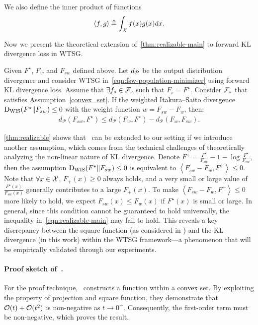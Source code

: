 We also define the inner product of functions 
$$\left \langle f,g \right \rangle \triangleq \int_{\mathcal{X}} f(x)g(x) d x.$$


Now we present the theoretical extension of~\cref{thm:realizable-main} to forward KL divergence loss in WTSG.





\begin{corollary} \label{thm:realizable}
Given $F^\star$, $F_w$ and $F_{sw}$ defined above.
Let $d_\mathcal{P}$ be the output distribution divergence and consider WTSG in~\cref{eqn:fsw-population-minimizer} using forward KL divergence loss.
Assume that $\exists f_s \in \mathcal{F}_s$ such that $F_s = F^\star$.
Consider $\mathcal{F}_s$ that satisfies Assumption~\ref{convex_set}. 
If the weighted Itakura–Saito divergence $\mathrm{D}_{\mathrm{WIS}}(F^\star \| F_{sw}) \le 0$ with the weight function $w=F_{sw} - F_w$, then:
\begin{align} \label{eqn:realizable}
    d_{\mathcal{P}}\left(F_{sw}, F^\star\right) \leq d_{\mathcal{P}}\left(F_w, F^\star\right)-d_{\mathcal{P}}\left(F_w, F_{sw}\right).
\end{align}
\end{corollary}

\cref{thm:realizable} shows that~\citet{charikar2024quantifying} can be extended to our setting if we introduce another assumption, which comes from the technical challenges of theoretically analyzing the non-linear nature of KL divergence.
Denote $F^+ = \frac{F^\star}{F_{sw}} - 1 - \log{\frac{F^\star}{F_{sw}}}$, then the assumption $\mathrm{D}_{\mathrm{WIS}}(F^\star \| F_{sw}) \le 0$ is equivalent to $\left \langle F_{sw} - F_w, F^+ \right \rangle \le 0$.
Note that $\forall x \in \mathcal{X}$, $F_+(x) \ge 0$ always holds, and a very small or large value of $\frac{F^\star(x)}{F_{sw}(x)}$ generally contributes to a large $F_+(x)$.
To make $\left \langle F_{sw} - F_w, F^+ \right \rangle \le 0$ more likely to hold, we expect $F_{sw}(x) \le F_w(x)$ if $F^\star(x)$ is small or large.
In general, since this condition cannot be guaranteed to hold universally, the inequality in~\cref{eqn:realizable-main} may fail to hold. 
This reveals a key discrepancy between the square function (as considered in \citet{charikar2024quantifying}) and the KL divergence (in this work) within the WTSG framework—a phenomenon that will be empirically validated through our experiments.


\paragraph{Proof sketch of~\citet{charikar2024quantifying}.}
For the proof technique,~\citet{charikar2024quantifying} constructs a function within a convex set.
By exploiting the property of projection and square function, they demonstrate that $\mathcal{O}(t)+\mathcal{O}(t^2)$ is non-negative as $t \to 0^+$. Consequently, the first-order term must be non-negative, which proves the result.


